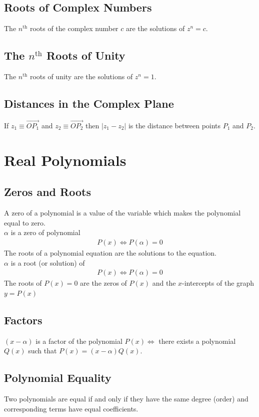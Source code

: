 \documentclass[10pt, a4paper, titlepage]{article}
\begin{document}
\begin{multicols*}{3}
	\subsection{Roots of Complex Numbers}
	The $n^{\text{th}}$ roots of the complex number $c$ are the solutions of $z^n=c$.

	\dotfill
	\subsection{The $n^{\text{th}}$ Roots of Unity}
	The $n^{\text{th}}$ roots of unity are the solutions of $z^n = 1$.
	
	\dotfill
	\subsection{Distances in the Complex Plane}
	If $z_1\equiv \overrightarrow{OP_1}$ and $z_2\equiv \overrightarrow{OP_2}$ then $|z_1-z_2|$ is the distance between points $P_1$ and $P_2$.

	\hrulefill

\section{Real Polynomials}
	\subsection{Zeros and Roots}
	A zero of a polynomial is a value of the variable which makes the polynomial equal to zero.\\
	$\alpha$ is a zero of polynomial
	\begin{align}
		P(x)\iff P(\alpha)=0
	\end{align}
	The roots of a polynomial equation are the solutions to the equation.\\
	$\alpha$ is a root (or solution) of
	\begin{align}
		P(x)\iff P(\alpha)=0
	\end{align}
	The roots of $P(x)=0$ are the zeros of $P(x)$ and the $x$-intercepts of the graph $y=P(x)$
	
	\dotfill
	\subsection{Factors}
	$(x-\alpha)$ is a factor of the polynomial $P(x)\iff$ there exists a polynomial $Q(x)$ such that $P(x)=(x-\alpha)Q(x)$.
	
	\dotfill
	\subsection{Polynomial Equality}
	Two polynomials are equal if and only if they have the same degree (order) and corresponding terms have equal coefficients.
	

\end{multicols*}
\end{document}
